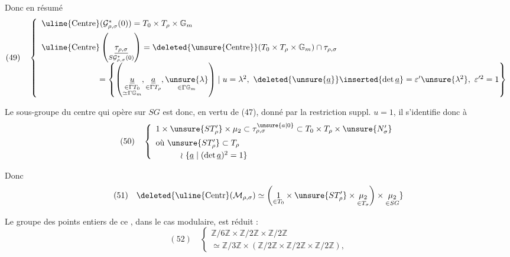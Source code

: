 

Donc en résumé
\[
(49)\quad
\left\{
\begin{array}{l}
\uline{\mathrm{Centre}}(\mathcal G^*_{\rho,\sigma}(0))=T_0\times T_\rho\times\mathbb G_m\\[5pt]
\uline{\mathrm{Centre}}\left(\underset{S\mathcal G^*_{\rho,\sigma}(0)}{\underline{\tau_{\rho,\sigma}}}\right)
=\deleted{\unsure{\mathrm{Centre}}}(T_0\times T_\rho\times\mathbb G_m)\cap\tau_{\rho,\sigma}\\[7pt]
\hspace{7em}=\left\{\left(
\underset{\substack{\in\Gamma T_0\\\simeq\Gamma\mathbb G_m}}{\underline u},
\underset{\in\Gamma T_\rho}{\underline a},
\underset{\in\Gamma\mathbb G_m}{\unsure{\lambda}}
\right)\mid u=\lambda^2,\ \deleted{\unsure{\underline a}}\inserted{\det\underline a}=\varepsilon'\unsure{\lambda^2},\ \varepsilon'^2=1\right\}
\end{array}\right.
\]

Le sous-groupe du centre qui opère  sur $SG$ est donc, en vertu de (47), donné par la restriction suppl. $u=1$, il s'identifie donc à 
\[
(50)\quad
\left\{
\begin{array}{l}
1\times\unsure{ST'_\rho}\times\mu_2\subset\tau^{\unsure{a|0}}_{\rho,\sigma}\subset T_0\times T_\rho\times\unsure{N'_\sigma}\\[5pt]
\text{où }\unsure{ST'_\rho}\subset T_\rho\\[3pt]
\hspace{3em}\wr\ \{\underline a\mid(\det\underline a)^2=1\}
\end{array}\right.
\]

Donc
\[
(51)\quad
\deleted{\uline{\mathrm{Centr}}(\mathcal M_{\rho,\sigma})\simeq
\left(\underset{\in T_0}{1}\times\unsure{ST'_\rho}\times\underset{\in T_\sigma}{\mu_2}\right)\times\underset{\in SG}{\mu_2}}
\]

Le groupe des points entiers de ce , dans le cas modulaire, est réduit :
\[
(52)\quad
\left\{
\begin{array}{l}
\mathbb Z/6\mathbb Z\times\mathbb Z/2\mathbb Z\times\mathbb Z/2\mathbb Z\\[4pt]
\simeq\mathbb Z/3\mathbb Z\times(\mathbb Z/2\mathbb Z\times\mathbb Z/2\mathbb Z\times\mathbb Z/2\mathbb Z),
\end{array}\right.
\]

